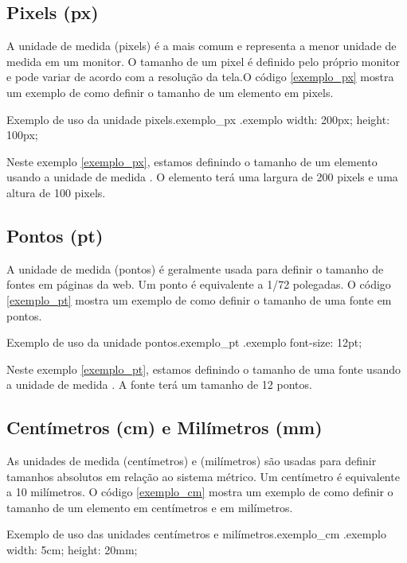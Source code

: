 \subsection{Pixels (px)}

A unidade de medida  (pixels) é a mais comum e representa a menor unidade de medida em um monitor. O tamanho de um pixel é definido pelo próprio monitor e pode variar de acordo com a resolução da tela.O código \ref{exemplo_px} mostra um exemplo de como definir o tamanho de um elemento em pixels.

\begin{csscode}{Exemplo de uso da unidade pixels.}{exemplo_px}
.exemplo {
    width: 200px;
    height: 100px;
}
\end{csscode}

Neste exemplo \ref{exemplo_px}, estamos definindo o tamanho de um elemento usando a unidade de medida . O elemento terá uma largura de 200 pixels e uma altura de 100 pixels.

\subsection{Pontos (pt)}

A unidade de medida  (pontos) é geralmente usada para definir o tamanho de fontes em páginas da web. Um ponto é equivalente a 1/72 polegadas. O código \ref{exemplo_pt} mostra um exemplo de como definir o tamanho de uma fonte em pontos.

\begin{csscode}{Exemplo de uso da unidade pontos.}{exemplo_pt}
.exemplo {
    font-size: 12pt;
}
\end{csscode}

Neste exemplo \ref{exemplo_pt}, estamos definindo o tamanho de uma fonte usando a unidade de medida . A fonte terá um tamanho de 12 pontos.

\subsection{Centímetros (cm) e Milímetros (mm)}

As unidades de medida  (centímetros) e  (milímetros) são usadas para definir tamanhos absolutos em relação ao sistema métrico. Um centímetro é equivalente a 10 milímetros. O código \ref{exemplo_cm} mostra um exemplo de como definir o tamanho de um elemento em centímetros e em milímetros.

\begin{csscode}{Exemplo de uso das unidades centímetros e milímetros.}{exemplo_cm}
.exemplo {
    width: 5cm;
    height: 20mm;
}
\end{csscode}

